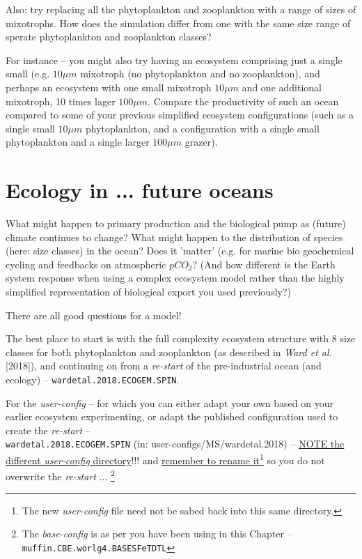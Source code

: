 \documentclass[11pt,fleqn]{book} %
\begin{document}
Also: try replacing all the phytoplankton and zooplankton with a range of sizes of mixotrophs. How does the simulation differ from one with the same size range of sperate phytoplankton and zooplankton classes?

For instance -- you might also try having an ecosystem comprising just a single small (e.g. \(10 \mu m\) mixotroph (no phytoplankton and no zooplankton), and perhaps an ecosystem with one small mixotroph \(10 \mu m\) and one additional mixotroph, 10 times lager \(100 \mu m\). Compare the productivity of such an ocean compared to some of your previous simplified ecosystem configurations (such as a single small \(10 \mu m\) phytoplankton, and a configuration with a single small phytoplankton and a single larger \(100 \mu m\) grazer).
%

\newpage


\section{Ecology in ... future oceans}

What might happen to primary production and the biological pump as (future) climate continues to change? What might happen to the distribution of species (here: size classes) in the ocean? Does it 'matter' (e.g. for marine bio geochemical cycling and feedbacks on atmospheric \(pCO_{2}\)? (And how different is the Earth system response when using a complex ecosystem model rather than the highly simplified representation of biological export you used previously?)

\vspace{1mm}
There are all good questions for a model!

\vspace{1mm}
The best place to start is with the full complexity ecosystem structure with 8 size classes for both phytoplankton and zooplankton (as described in \textit{Ward et al.} [2018]), and continuing on from a \textit{re-start} of the pre-industrial ocean (and ecology) -- \texttt{wardetal.2018.ECOGEM.SPIN}. 

For the \textit{user-config} -- for which you can either adapt your own based on your earlier ecosystem experimenting, or adapt the published configuration used to create the \textit{re-start} -- \\\texttt{wardetal.2018.ECOGEM.SPIN} (in: \textsf{\footnotesize user-configs/MS/wardetal.2018}) -- \uline{NOTE the different \textit{user-config} directory}!!! and \uline{remember to rename it}\footnote{The new \textit{user-config} file need not be sabed back into this same directory.} so you do not overwrite the \textit{re-start} ... \footnote{The \textit{base-config} is as per you have been using in this Chapter -- \texttt{muffin.CBE.worlg4.BASESFeTDTL}} 
\vspace{2mm}
\end{document}
